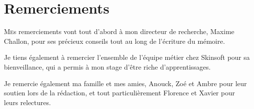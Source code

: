 \documentclass[12pt,twoside]{book}
\begin{document}
	
	\chapter{Remerciements}
	
\lettrine{M}es remerciements vont tout d'abord à mon directeur de recherche, Maxime Challon, pour ses précieux conseils tout au long de l'écriture du mémoire. 

Je tiens également à remercier l'ensemble de l'équipe métier chez Skinsoft pour sa bienveillance, qui a permis à mon stage d'être riche d'apprentissages. 

Je remercie également ma famille et mes amies, Anouck, Zoé et Ambre pour leur soutien lors de la rédaction, et tout particulièrement Florence et Xavier pour leurs relectures. 

	\newpage{\pagestyle{empty}\cleardoublepage}
	
\printbibliography



%
%
%
%
%
%
%

	
	


\newpage{\pagestyle{empty}\cleardoublepage}

	\mainmatter
\end{document}
